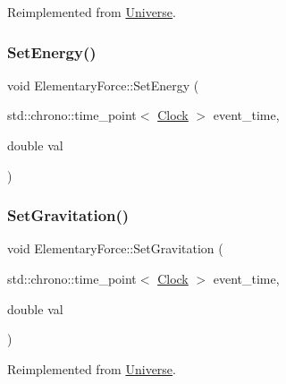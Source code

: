 Reimplemented from \mbox{\hyperlink{classUniverse_a608aa95698380f791a0ffba45cc1bee3}{Universe}}.

\mbox{\label{classElementaryForce_a466c84ee4a50a29ef1f0fc6509ae3161}} 
\subsubsection{\texorpdfstring{Set\+Energy()}{SetEnergy()}}
{\footnotesize\ttfamily void Elementary\+Force\+::\+Set\+Energy (\begin{DoxyParamCaption}\item[{std\+::chrono\+::time\+\_\+point$<$ \mbox{\hyperlink{universe_8h_a0ef8d951d1ca5ab3cfaf7ab4c7a6fd80}{Clock}} $>$}]{event\+\_\+time,  }\item[{double}]{val }\end{DoxyParamCaption})}

\mbox{\label{classElementaryForce_aa36d5875964f7e2fc981f6fc5431be7f}} 
\subsubsection{\texorpdfstring{Set\+Gravitation()}{SetGravitation()}}
{\footnotesize\ttfamily void Elementary\+Force\+::\+Set\+Gravitation (\begin{DoxyParamCaption}\item[{std\+::chrono\+::time\+\_\+point$<$ \mbox{\hyperlink{universe_8h_a0ef8d951d1ca5ab3cfaf7ab4c7a6fd80}{Clock}} $>$}]{event\+\_\+time,  }\item[{double}]{val }\end{DoxyParamCaption})\hspace{0.3cm}{\ttfamily [virtual]}}



Reimplemented from \mbox{\hyperlink{classUniverse_ae0cb8d86b2fbb8396d605160344b42f5}{Universe}}.

\mbox{\label{classElementaryForce_aa1b5708cfab2069049fec5c924e1f246}} 
